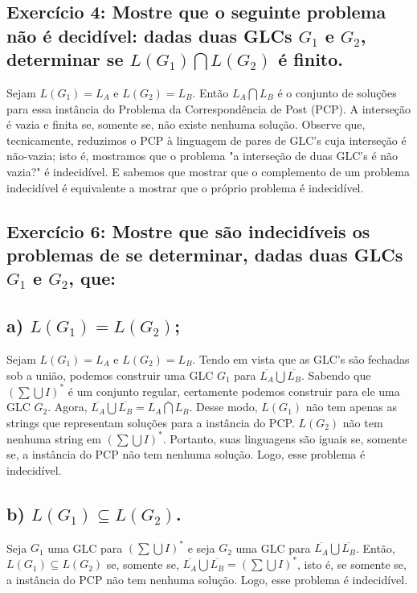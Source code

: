 

\subsection*{Exercício 4: Mostre que o seguinte problema não é decidível: dadas duas GLCs $G_1$ e $G_2$, determinar se $L(G_1) \bigcap L(G_2)$ é finito.}

Sejam $L(G_1)=L_A$ e $L(G_2)=L_B$. Então $L_A \bigcap L_B$ é o conjunto de soluções para essa instância do Problema da Correspondência de Post (PCP). A interseção é vazia e finita se, somente se, não existe nenhuma solução. Observe que, tecnicamente, reduzimos o PCP à linguagem de pares de GLC's cuja interseção é não-vazia; isto é, mostramos que o problema "a interseção de duas GLC's é não vazia?" é indecidível. E sabemos que mostrar que o complemento de um problema indecidível é equivalente a mostrar que o próprio problema é indecidível.



\subsection*{Exercício 6: Mostre que são indecidíveis os problemas de se determinar, dadas duas GLCs $G_1$ e $G_2$, que:}

\subsection*{a) $L(G_1)=L(G_2)$;}

Sejam $L(G_1)=L_A$ e $L(G_2)=L_B$. Tendo em vista que as GLC's são fechadas sob a união, podemos construir uma GLC $G_1$ para $\overline{L_A} \bigcup \overline{L_B}$. Sabendo que $(\sum \bigcup I)^{*}$ é um conjunto regular, certamente podemos construir para ele uma GLC $G_2$. Agora, $\overline{L_A} \bigcup \overline{L_B}=\overline{L_A \bigcap L_B}$. Desse modo, $L(G_1)$ não tem apenas as strings que representam soluções para a instância do PCP. $L(G_2)$ não tem nenhuma string em $(\sum \bigcup I)^{*}$. Portanto, suas linguagens são iguais se, somente se, a instância do PCP não tem nenhuma solução. Logo, esse problema é indecidível.

\subsection*{b) $L(G_1) \subseteq L(G_2)$.}

Seja $G_1$ uma GLC para $(\sum \bigcup I)^{*}$ e seja $G_2$ uma GLC para $\overline{L_A} \bigcup \overline{L_B}$. Então, $L(G_1) \subseteq L(G_2)$ se, somente se,  $\overline{L_A} \bigcup \overline{L_B}=(\sum \bigcup I)^{*}$, isto é, se somente se, a instância do PCP não tem nenhuma solução. Logo, esse problema é indecidível.